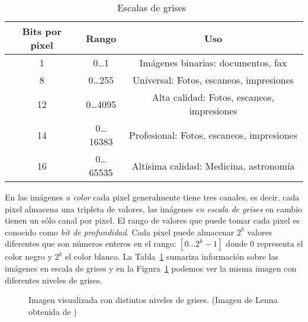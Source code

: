 \begin{table}
  \caption[Escala de grises]{Escalas de grises~\cite{burger2008digital}}
  \label{table:grayscales}
\begin{center}
{\scriptsize
    \begin{tabular}{c|c|c}
    \hline
    {\bf Bits por pixel} &
    {\bf Rango} &
    {\bf Uso} \\
    \hline
    1  & 0\dots1     & Imágenes binarias: documentos, fax \\
    8  & 0\dots255   & Universal: Fotos, escaneos, impresiones   \\
    12 & 0\dots4095  & Alta calidad: Fotos, escaneos, impresiones   \\
    14 & 0\dots16383 & Profesional: Fotos, escaneos, impresiones   \\
    16 & 0\dots65535 & Altísima calidad: Medicina, astronomía   \\
    \hline
    \end{tabular}
}
\end{center}
\end{table}

En las imágenes \textit{a color} cada pixel generalmente tiene tres canales, es
decir, cada pixel almacena una tripleta de valores, las imágenes \textit{en
escala de grises} en cambio tienen un sólo canal por pixel. El rango de valores
que puede tomar cada pixel es conocido como \textit{bit de profundidad}. Cada
pixel puede almacenar $2^k$ valores diferentes que son números enteros en el
rango: $[0\dots2^k - 1]$ donde $0$ representa el color negro y $2^k$ el color
blanco. La Tabla~\ref{table:grayscales} sumariza información sobre las imágenes
en escala de grises y en la Figura~\ref{grayscales} podemos ver la misma imagen
con diferentes niveles de grises.

\begin{figure}[h]
    \centering


  \caption[Niveles de grises]{Imagen visualizada con distintos niveles de grises.
  (Imagen de Lenna obtenida de \cite{sipi})}

  \label{grayscales}
\end{figure}

